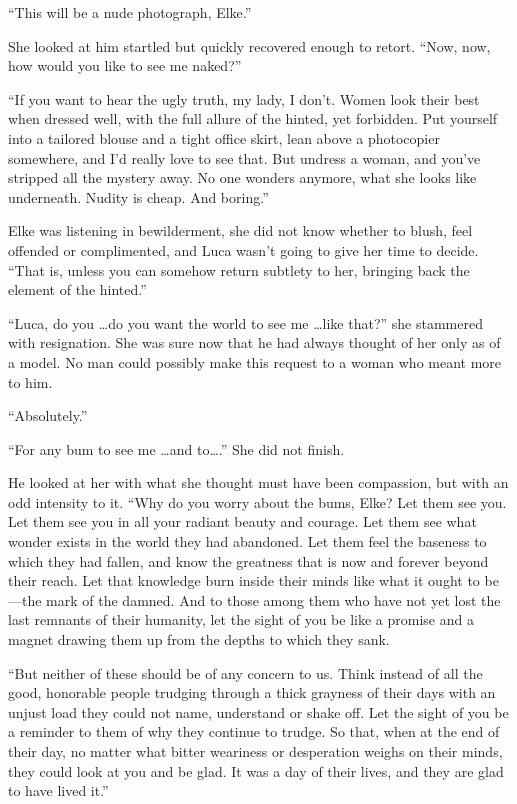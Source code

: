 \sectionline

``This will be a nude photograph, Elke.''

She looked at him startled but quickly recovered enough to retort. ``Now, now, how would you like to see me naked?''

``If you want to hear the ugly truth, my lady, I don't. Women look their best when dressed well, with the full allure of the hinted, yet forbidden. Put yourself into a tailored blouse and a tight office skirt, lean above a photocopier somewhere, and I'd really love to see that. But undress a woman, and you've stripped all the mystery away. No one wonders anymore, what she looks like underneath. Nudity is cheap. And boring.''

Elke was listening in bewilderment, she did not know whether to blush, feel offended or complimented, and Luca wasn't going to give her time to decide. ``That is, unless you can somehow return subtlety to her, bringing back the element of the hinted.''

``Luca, do you \ldots do you want the world to see me \ldots like that?'' she stammered with resignation. She was sure now that he had always thought of her only as of a model. No man could possibly make this request to a woman who meant more to him.

``Absolutely.''

``For any bum to see me \ldots and to\ldots.'' She did not finish.

He looked at her with what she thought must have been compassion, but with an odd intensity to it. ``Why do you worry about the bums, Elke? Let them see you. Let them see you in all your radiant beauty and courage. Let them see what wonder exists in the world they had abandoned. Let them feel the baseness to which they had fallen, and know the greatness that is now and forever beyond their reach. Let that knowledge burn inside their minds like what it ought to be---the mark of the damned. And to those among them who have not yet lost the last remnants of their humanity, let the sight of you be like a promise and a magnet drawing them up from the depths to which they sank.

``But neither of these should be of any concern to us. Think instead of all the good, honorable people trudging through a thick grayness of their days with an unjust load they could not name, understand or shake off. Let the sight of you be a reminder to them of why they continue to trudge. So that, when at the end of their day, no matter what bitter weariness or desperation weighs on their minds, they could look at you and be glad. It was a day of their lives, and they are glad to have lived it.''

